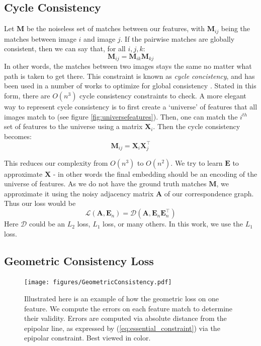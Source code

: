\documentclass[10pt,twocolumn,letterpaper]{article}
\newcommand{\mat}[1]{\mathbf{#1}}
\begin{document}
\subsection{Cycle Consistency}

Let $\mat{M}$ be the noiseless set of matches between our features, with $\mat{M}_{ij}$ being the matches between image $i$ and image $j$.
If the pairwise matches are globally consistent, then we can say that, for all $i, j, k$:
\begin{equation}
\mat{M}_{ij} = \mat{M}_{ik} \mat{M}_{kj}
\label{eq:cycconsist1}
\end{equation}
In other words, the matches between two images stays the same no matter what path is taken to get there. 
This constraint is known as \textit{cycle concistency}, and has been used in a number of works to optimize for global consistency \cite{zhou2015multi, wang2017multi, leonardos2016distributed}.
Stated in this form, there are $O(n^3)$ cycle consistency constraints to check.
A more elegant way to represent cycle consistency is to first create a `universe' of features that all images match to (see figure \ref{fig:universefeatures}).
Then, one can match the $i^{th}$ set of features to the universe using a matrix $\mat{X}_i$.
Then the cycle consistency becomes:
\begin{equation}
\mat{M}_{ij} = \mat{X}_{i}\mat{X}_{j}^\top
\label{eq:cycconsist2}
\end{equation}

This reduces our complexity from $O(n^3)$ to $O(n^2)$.
We try to learn $\mat{E}$ to approximate $\mat{X}$ - in other words the final embedding should be an encoding of the universe of features. As we do not have the ground truth matches $\mat{M}$, we approximate it using the noisy adjacency matrix $\mat{A}$ of our correspondence graph. Thus our loss would be 
\begin{equation}
\mathcal{L}(\mat{A}, \mat{E}_n) = \mathcal{D}(\mat{A}, \mat{E}_n\mat{E}_n^\top)
\end{equation}
Here $\mathcal{D}$ could be an $L_2$ loss, $L_1$ loss, or many others. In this work, we use the $L_1$ loss. 

\subsection{Geometric Consistency Loss}

\begin{figure}[t]
\begin{center}
  \texttt{[image: figures/GeometricConsistency.pdf]}
\end{center}
  \caption{
    Illustrated here is an example of how the geometric loss on one feature.  
    We compute the errors on each feature match to determine their validity.
    Errors are computed via absolute distance from the epipolar line, as expressed by (\ref{eq:essential_constraint}) via the epipolar constraint.
    Best viewed in color.
  }
\label{fig:geoconsist}
\label{fig:onecol}
\end{figure}
\end{document}

